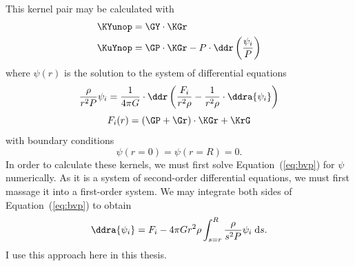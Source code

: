 \begin{description}
\setlength{\itemindent}{0pt}
\item[Thompson--JCD Formulation.]
This kernel pair may be calculated with \citep[][their Equation~A9]{ThompsonJCD2002} 
\begin{align}
    \KYunop &= \GY \cdot \KGr
\\  \KuYnop &= \GP \cdot \KGr - P \cdot \ddr \left( \frac{\psi_i}{P} \right) \label{eq:Gough-JCD-KuY}
\end{align}
where ${\psi(r)}$ is the solution to the system of differential equations %
\begin{equation} \label{eq:bvp}
    \frac{\rho}{r^2 P}
    \psi_i
    =
    \frac{1}{4\pi G} \cdot %
    \ddr \left( 
        \frac{F_i}{r^2 \rho} 
    -
        \frac{1}{r^2 \rho} \cdot \ddra{\psi_i} 
    \right)
\end{equation}
\begin{equation}
    F_i(r) = (\GP + \Gr) \cdot \KGr + \KrG
\end{equation}
with boundary conditions
\begin{equation} \label{eq:bcs1}
    \psi(r=0) = \psi(r=R) = 0.
\end{equation}
In order to calculate these kernels, we must first solve Equation~(\ref{eq:bvp}) for $\psi$ numerically. As it is a system of second-order differential equations, we must first massage it into a first-order system. We may integrate both sides of Equation~(\ref{eq:bvp}) to obtain 
\begin{equation}
    \ddra{\psi_i} = F_i - 4\pi G r^2 \rho \int_{s=r}^R \frac{\rho}{s^2 P} \psi_i \; \text{d}s.
\end{equation}
I use this approach here in this thesis. 



\end{description}
